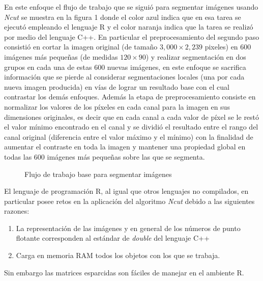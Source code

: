 \documentclass[conference]{IEEEtran}
\begin{document}
En este enfoque el flujo de trabajo que se siguió para segmentar imágenes usando \textit{Ncut} se muestra en la figura 1 donde el color azul indica que en esa tarea se ejecutó empleando el lenguaje R y el color naranja indica que la tarea se realizó por medio del lenguaje C++. En particular el preprocesamiento del segundo paso consistió en cortar la imagen original (de tamaño $3,000 \times 2,239$ pixeles) en 600 imágenes más pequeñas (de medidas $120 \times 90$) y realizar segmentación en dos grupos en cada una de estas 600 nuevas imágenes, en este enfoque se sacrifica información que se pierde al considerar segmentaciones locales (una por cada nueva imagen producida) en vías de lograr un resultado base con el cual contrastar los demás enfoques. Además la etapa de preprocesamiento consiste en normalizar los valores de los píxeles en cada canal para la imagen en sus dimensiones originales, es decir que en cada canal a cada valor de píxel se le restó el valor mínimo encontrado en el canal y se dividió el resultado entre el rango del canal original (diferencia entre el valor máximo y el mínimo) con la finalidad de aumentar el contraste en toda la imagen y mantener una propiedad global en todas las 600 imágenes más pequeñas sobre las que se segmenta.\\

\begin{figure}[htbp]
\caption{Flujo de trabajo base para segmentar imágenes}
\label{workflow}
\end{figure}

El lenguaje de programación R, al igual que otros lenguajes no compilados, en particular posee retos en la aplicación del algoritmo \textit{Ncut} debido a las siguientes razones: 
\begin{enumerate}
\item La representación de las imágenes y en general de los números de punto flotante corresponden al estándar de \textit{double} del lenguaje C++
\item Carga en memoria RAM todos los objetos con los que se trabaja. 
\end{enumerate}
Sin embargo las matrices esparcidas son fáciles de manejar en el ambiente R.\\
\end{document}
